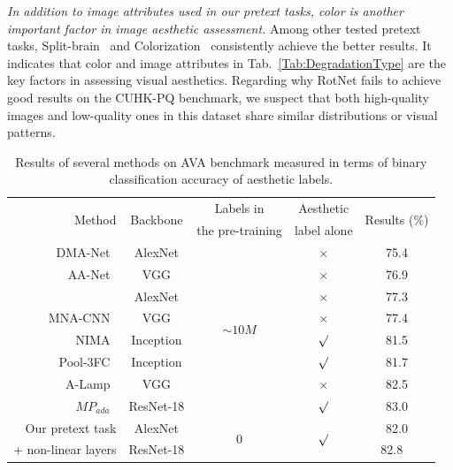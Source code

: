 \documentclass[letterpaper]{article}
\newcommand{\commentout}[1]{} %
\begin{document}
\emph{In addition to image attributes used in our pretext tasks, color is another important factor in image aesthetic assessment.}
Among other tested pretext tasks, Split-brain~\cite{zhang2017split} and Colorization~\cite{zhang2016colorful} consistently achieve the better results.
It indicates that color and image attributes in Tab.~\ref{Tab:DegradationType} are the key factors in assessing visual aesthetics.
Regarding why RotNet fails to achieve good results on the CUHK-PQ benchmark, we suspect that both high-quality images and low-quality ones in this dataset share similar distributions or visual patterns\commentout{ in the structure line}.

\begin{table}
    \centering
    \footnotesize{
    \caption{Results of several methods on AVA benchmark measured in terms of binary classification accuracy of aesthetic labels.}
    \label{Tab:ResultsOnAVA_VSFS}
    \begin{tabular}{r|cccc}
    	\toprule
    	\multirow{2}{*}{Method} & \multirow{2}{*}{Backbone} & Labels in & Aesthetic & \multirow{2}{*}{Results ($\%$)} \\
    	 & & the pre-training & label alone & \\
    	\hline
    	DMA-Net~\cite{lu2015deep}            & AlexNet & \multirow{8}{*}{$\sim 10M$} & $\times$ & 75.4 \\
    	AA-Net~\cite{wang2017deep}               & VGG & & $\times$ & 76.9 \\
    	~\cite{kong2016photo}                    & AlexNet & & $\times$ & 77.3 \\
    	MNA-CNN~\cite{mai2016composition}  & VGG & & $\times$ & 77.4 \\
    	NIMA~\cite{talebi2018nima}               & Inception & & $\surd$ & 81.5 \\
    	Pool-3FC~\cite{hosu2019effective}        & Inception & & $\surd$ & 81.7 \\
    	A-Lamp~\cite{ma2017lamp}                 & VGG & & $\times$ & 82.5 \\
    	$MP_{ada}$~\cite{sheng2018attention}     & ResNet-18 & & $\surd$ & 83.0 \\
    	\hline
    	Our pretext task & AlexNet & \multirow{2}{*}{0} & \multirow{2}{*}{$\surd$} & 82.0 \\
    	+ non-linear layers & ResNet-18 & & & 82.8 \ \\
    	\bottomrule
    \end{tabular}
    }
\end{table}
\end{document}
